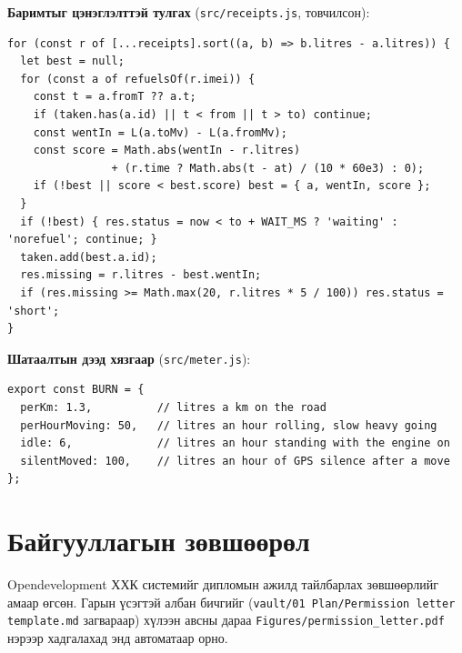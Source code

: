 \documentclass[
12pt,
oneside,
english,
onehalfspacing,
nolistspacing,
headsepline,
]{MUST-Thesis}
\begin{document}
\textbf{Баримтыг цэнэглэлттэй тулгах} (\texttt{src/receipts.js}, товчилсон):
\begin{verbatim}
for (const r of [...receipts].sort((a, b) => b.litres - a.litres)) {
  let best = null;
  for (const a of refuelsOf(r.imei)) {
    const t = a.fromT ?? a.t;
    if (taken.has(a.id) || t < from || t > to) continue;
    const wentIn = L(a.toMv) - L(a.fromMv);
    const score = Math.abs(wentIn - r.litres)
                + (r.time ? Math.abs(t - at) / (10 * 60e3) : 0);
    if (!best || score < best.score) best = { a, wentIn, score };
  }
  if (!best) { res.status = now < to + WAIT_MS ? 'waiting' : 'norefuel'; continue; }
  taken.add(best.a.id);
  res.missing = r.litres - best.wentIn;
  if (res.missing >= Math.max(20, r.litres * 5 / 100)) res.status = 'short';
}
\end{verbatim}

\textbf{Шатаалтын дээд хязгаар} (\texttt{src/meter.js}):
\begin{verbatim}
export const BURN = {
  perKm: 1.3,          // litres a km on the road
  perHourMoving: 50,   // litres an hour rolling, slow heavy going
  idle: 6,             // litres an hour standing with the engine on
  silentMoved: 100,    // litres an hour of GPS silence after a move
};
\end{verbatim}

\section{Байгууллагын зөвшөөрөл}\label{app:permission}

Opendevelopment ХХК системийг дипломын ажилд тайлбарлах зөвшөөрлийг амаар өгсөн. Гарын үсэгтэй албан бичгийг (\texttt{vault/01 Plan/Permission letter template.md} загвараар) хүлээн авсны дараа \texttt{Figures/permission\_letter.pdf} нэрээр хадгалахад энд автоматаар орно.

\end{document}
